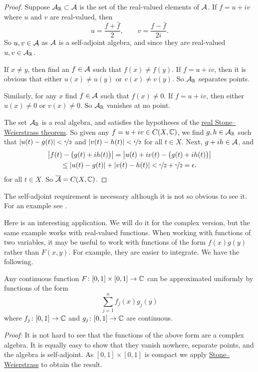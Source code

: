 \begin{proof}
Suppose ${\mathcal{A}}_{\mathbb{R}} \subset {\mathcal{A}}$ is the set of the real-valued elements of
${\mathcal{A}}$.  If $f = u+iv$ where $u$ and $v$ are real-valued, then
\begin{equation*}
u = \frac{f+\bar{f}}{2}, \qquad
v = \frac{f-\bar{f}}{2i} .
\end{equation*}
So $u, v \in {\mathcal{A}}$ as ${\mathcal{A}}$ is a self-adjoint algebra, and since they are
real-valued $u, v \in {\mathcal{A}}_{\mathbb{R}}$.

If $x \not= y$, then find an $f \in {\mathcal{A}}$ such that $f(x) \not= f(y)$.  If $f
= u+iv$, then it is obvious that either $u(x) \not= u(y)$ or $v(x) \not=
v(y)$.  So ${\mathcal{A}}_{\mathbb{R}}$ separates points.

Similarly, for any $x$ find $f \in {\mathcal{A}}$ such that $f(x) \not= 0$.  If $f
= u+iv$, then either $u(x) \not= 0$ or $v(x) \not= 0$.
So ${\mathcal{A}}_{\mathbb{R}}$ vanishes at no point.

The set ${\mathcal{A}}_{\mathbb{R}}$ is a real algebra, and satisfies the hypotheses of the
\hyperref[thm:SWreal]{real Stone--Weierstrass theorem}.  So given any $f = u+iv \in C(X,{\mathbb{C}})$,
we find $g,h \in {\mathcal{A}}_{\mathbb{R}}$ such that
$\lvert {u(t)-g(t)} \rvert < \nicefrac{\epsilon}{2}$ and
$\lvert {v(t)-h(t)} \rvert < \nicefrac{\epsilon}{2}$ for all $t \in X$.
Next, $g+i h \in {\mathcal{A}}$, and
\begin{multline*}
\left\lvert {f(t) - \bigl(g(t)+ih(t)\bigr)} \right\rvert = 
\left\lvert {u(t)+iv(t) - \bigl(g(t)+ih(t)\bigr)} \right\rvert \\
\leq
\lvert {u(t)-g(t)} \rvert+\lvert {v(t)-h(t)} \rvert < \nicefrac{\epsilon}{2} +
\nicefrac{\epsilon}{2} = \epsilon.
\end{multline*}
for all $t \in X$.
So $\overline{{\mathcal{A}}} = C(X,{\mathbb{C}})$.
\end{proof}

The self-adjoint requirement is necessary although it is not so obvious to
see it.  For an example see .

Here is an interesting application.  We will do it for the complex version, but
the same example works with real-valued functions.  When working
with functions of two variables, it may be useful to work with functions
of the form $f(x)g(y)$ rather than $F(x,y)$.  For example, they are easier
to integrate.  We have the following.

\begin{example}
Any continuous function $F \colon [0,1] \times [0,1] \to {\mathbb{C}}$ can be
approximated uniformly by functions of the form
\begin{equation*}
\sum_{j=1}^n f_j(x) g_j(y)
\end{equation*}
where $f_j \colon [0,1] \to {\mathbb{C}}$ and $g_j \colon [0,1] \to {\mathbb{C}}$ are continuous.

\emph{Proof:}
It is not hard to see that the functions of the above form are a complex
algebra.  It is equally easy to show that they vanish nowhere, separate
points, and the algebra is self-adjoint.  As $[0,1] \times [0,1]$ is compact
we apply \hyperref[thm:SWcomplex]{Stone--Weierstrass} to obtain the result.
\end{example}

